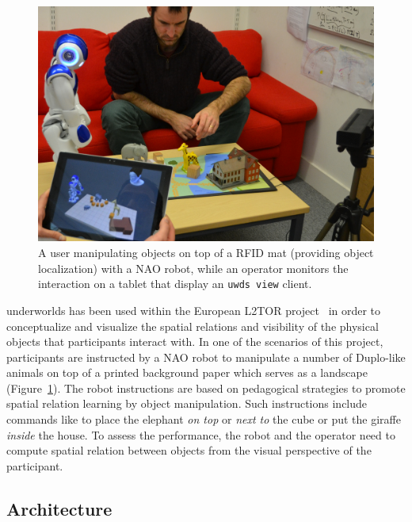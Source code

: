 \documentclass[letterpaper, 10 pt, conference]{ieeeconf}  %
\newcommand{\uwds}{{\sc underworlds}\xspace}
\begin{document}
\begin{figure}
    \centering
    \includegraphics[width=\linewidth]{l2tor-photo2}
    \caption{A user manipulating objects on top of a RFID mat (providing object
    localization) with a NAO robot, while an operator monitors
    the interaction on a tablet that display an {\tt uwds view} client.}

    \label{fig|l2torexample}
\end{figure}

\uwds has been used within the European L2TOR project~\cite{belpaeme2015l2tor}
in order to conceptualize and visualize the spatial relations and visibility of
the physical objects that participants interact with. In one of the scenarios of this
project, participants are instructed by a NAO robot to manipulate a number of
Duplo-like animals on top of a printed background paper which serves as a
landscape (Figure~\ref{fig|l2torexample}). The robot instructions are based on
pedagogical strategies to promote spatial relation learning by object
manipulation. Such instructions include commands like to place the elephant
\textit{on top} or \textit{next to} the cube or put the giraffe \textit{inside}
the house.  To assess the performance, the robot and the operator need to
compute spatial relation between objects from the visual perspective of the
participant.

\subsection*{Architecture}
\end{document}
